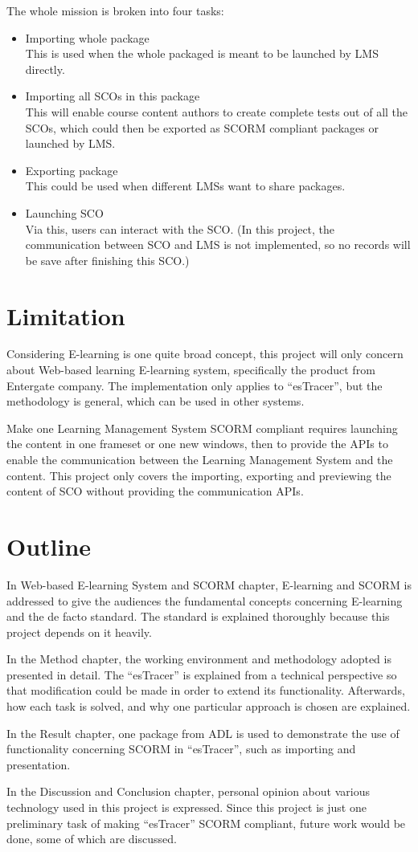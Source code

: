 The whole mission is broken into four tasks:
\begin{itemize}
	\item Importing whole package \\
		This is used when the whole packaged is meant to be launched by LMS directly.
	\item Importing all SCOs in this package \\
		This will enable course content authors to create complete tests out of all the SCOs, which could then be exported as SCORM compliant 
		packages or launched by LMS.
	\item Exporting package \\
		This could be used when different LMSs want to share packages.
	\item Launching SCO \\
		Via this, users can interact with the SCO. (In this project, the communication between SCO and LMS is not implemented, so no records will
		be save after finishing this SCO.)
\end{itemize}
\section{Limitation}
Considering E-learning is one quite broad concept, this project will only concern about Web-based learning E-learning system, specifically the 
product from Entergate company. The implementation only applies to ``esTracer'', but the methodology is general, which can be used in other systems.

Make one Learning Management System SCORM compliant requires launching the content in one frameset or one new windows, then to provide the APIs to 
enable the communication between the Learning Management System and the content. This project only covers the importing, exporting and previewing the 
content of SCO without providing the communication APIs.
\section{Outline}
In Web-based E-learning System and SCORM chapter, E-learning and SCORM is addressed to give the audiences the fundamental concepts concerning E-learning 
and the de facto standard. The standard is explained thoroughly because this project depends on it heavily.

In the Method chapter, the working environment and methodology adopted is presented in detail. The ``esTracer'' is explained from a technical perspective
so that modification could be made in order to extend its functionality. Afterwards, how each task is solved, and why one particular approach is 
chosen are explained.

In the Result chapter, one package from ADL is used to demonstrate the use of functionality concerning SCORM in ``esTracer'', such as importing and 
presentation.

In the Discussion and Conclusion chapter, personal opinion about various technology used in this project is expressed. Since this project is just one 
preliminary task of making ``esTracer'' SCORM compliant, future work would be done, some of which are discussed.
